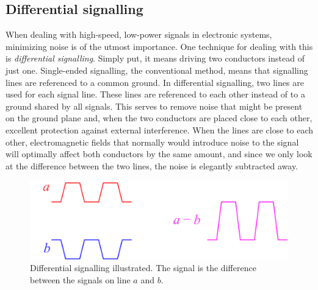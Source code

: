 \subsection{Differential signalling}

When dealing with high-speed, low-power signals in electronic systems, minimizing noise is of the utmost importance. One technique for dealing with this is \emph{differential signalling}. Simply put, it means driving two conductors instead of just one. Single-ended signalling, the conventional method, means that signalling lines are referenced to a common ground. In differential signalling, two lines are used for each signal line. These lines are referenced to each other instead of to a ground shared by all signals. This serves to remove noise that might be present on the ground plane and, when the two conductors are placed close to each other, excellent protection against external interference. When the lines are close to each other, electromagnetic fields that normally would introduce noise to the signal will optimally affect both conductors by the same amount, and since we only look at the difference between the two lines, the noise is elegantly subtracted away.

\begin{figure}[H]
    \centering
    \includegraphics[width=.75\textwidth]{media/diffsig.png}
    \caption{Differential signalling illustrated. The signal is the difference between the signals on line $a$ and $b$.}
    \label{fig:diffsig}
\end{figure}

